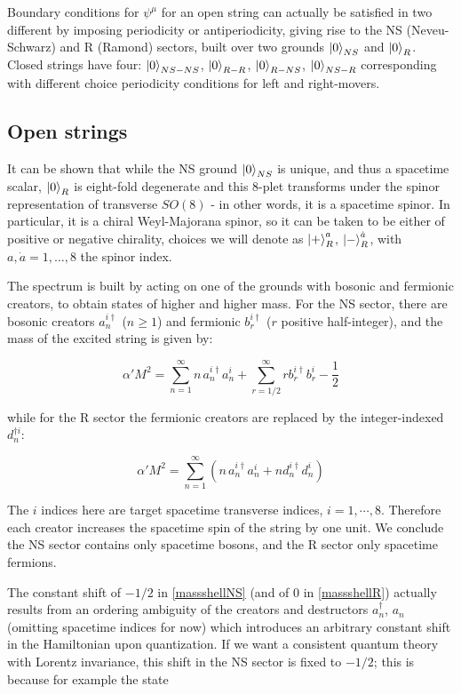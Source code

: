 Boundary conditions for $\psi^\mu$ for an open string can actually be satisfied in two different by imposing periodicity or antiperiodicity, giving rise to the NS (Neveu-Schwarz) and R (Ramond) sectors, built over two grounds $\ket{0}_{NS}$ and $\ket{0}_R$. Closed strings have four: $\ket{0}_{NS-NS}$, $\ket{0}_{R-R}$, $\ket{0}_{R-NS}$, $\ket{0}_{NS-R}$ corresponding with different choice periodicity conditions for left and right-movers.

\subsection{Open strings}

It can be shown that while the NS ground $\ket{0}_{NS}$ is unique, and thus a spacetime scalar, $\ket{0}_R$ is eight-fold degenerate and this 8-plet transforms under the spinor representation of transverse $SO(8)$ - in other words, it is a spacetime spinor. In particular, it is a chiral Weyl-Majorana spinor, so it can be taken to be either of positive or negative chirality, choices we will denote as $\ket{+}^a_R$, $\ket{-}^{\dot a}_R$, with $a,\dot{a}=1,\ldots,8$ the spinor index.

The spectrum is built by acting on one of the grounds with bosonic and fermionic creators, to obtain states of higher and higher mass. For the NS sector, there are bosonic creators $a_n^{i\dagger}$ ($n\geq 1$) and fermionic $b_r^{i\dagger}$ ($r$ positive half-integer), and the mass of the excited string is given by:

\begin{equation}
	\alpha' M^2 = \sum_{n=1}^\infty n \,a_n^{i\dagger} a_n^i  + \sum_{r=1/2}^\infty r b_r^{i\dagger} b_r^i - \frac{1}{2}
	\label{massshellNS}
\end{equation}

while for the R sector the fermionic creators are replaced by the integer-indexed $d_n^{\dagger i}$:

\begin{equation}
	\alpha' M^2 = \sum_{n=1}^\infty \left(n\, a_n^{i\dagger} a_n^i + n d_n^{i\dagger} d_n^i \right)
	\label{massshellR}
\end{equation}

The $i$ indices here are target spacetime transverse indices, $i=1,\cdots,8$. Therefore each creator increases the spacetime spin of the string by one unit. We conclude the NS sector contains only spacetime bosons, and the R sector only spacetime fermions.

The constant shift of $-1/2$ in \eqref{massshellNS} (and of $0$ in \eqref{massshellR}) actually results from an ordering ambiguity of the creators and destructors $a_n^\dagger$, $a_n$ (omitting spacetime indices for now) which introduces an arbitrary constant shift in the Hamiltonian upon quantization. If we want a consistent quantum theory with Lorentz invariance, this shift in the NS sector is fixed to $-1/2$; this is because for example the state

